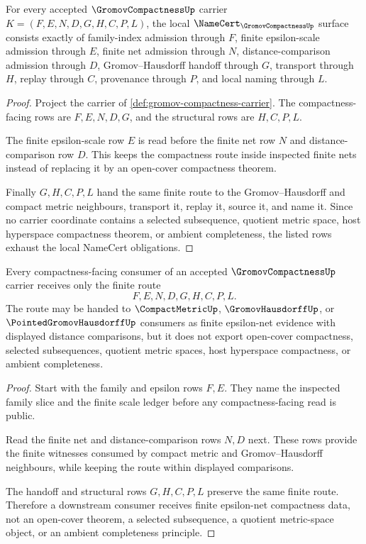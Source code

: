 \begin{theorem}
\label{thm:gromov-compactness-namecert-obligations}
For every accepted $\GromovCompactnessUp$ carrier $K=(F,E,N,D,G,H,C,P,L)$, the local $\NameCert_{\GromovCompactnessUp}$ surface consists exactly of family-index admission through $F$, finite epsilon-scale admission through $E$, finite net admission through $N$, distance-comparison admission through $D$, Gromov--Hausdorff handoff through $G$, transport through $H$, replay through $C$, provenance through $P$, and local naming through $L$.
\end{theorem}
\begin{proof}
Project the carrier of \autoref{def:gromov-compactness-carrier}. The compactness-facing rows are $F,E,N,D,G$, and the structural rows are $H,C,P,L$.

The finite epsilon-scale row $E$ is read before the finite net row $N$ and distance-comparison row $D$. This keeps the compactness route inside inspected finite nets instead of replacing it by an open-cover compactness theorem.

Finally $G,H,C,P,L$ hand the same finite route to the Gromov--Hausdorff and compact metric neighbours, transport it, replay it, source it, and name it. Since no carrier coordinate contains a selected subsequence, quotient metric space, host hyperspace compactness theorem, or ambient completeness, the listed rows exhaust the local NameCert obligations.
\end{proof}

\begin{theorem}
\label{thm:gromov-compactness-finite-epsilon-net-route}
Every compactness-facing consumer of an accepted $\GromovCompactnessUp$ carrier receives only the finite route
$$
F,E,N,D,G,H,C,P,L .
$$
The route may be handed to $\CompactMetricUp$, $\GromovHausdorffUp$, or $\PointedGromovHausdorffUp$ consumers as finite epsilon-net evidence with displayed distance comparisons, but it does not export open-cover compactness, selected subsequences, quotient metric spaces, host hyperspace compactness, or ambient completeness.
\end{theorem}
\begin{proof}
Start with the family and epsilon rows $F,E$. They name the inspected family slice and the finite scale ledger before any compactness-facing read is public.

Read the finite net and distance-comparison rows $N,D$ next. These rows provide the finite witnesses consumed by compact metric and Gromov--Hausdorff neighbours, while keeping the route within displayed comparisons.

The handoff and structural rows $G,H,C,P,L$ preserve the same finite route. Therefore a downstream consumer receives finite epsilon-net compactness data, not an open-cover theorem, a selected subsequence, a quotient metric-space object, or an ambient completeness principle.
\end{proof}

